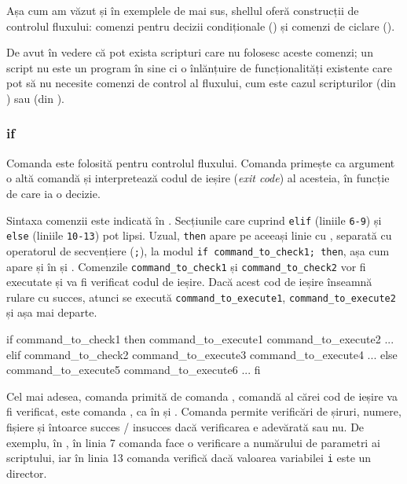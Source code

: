 Așa cum am văzut și în exemplele de mai sus, shellul oferă construcții de
controlul fluxului: comenzi pentru decizii condiționale () și comenzi de
ciclare ().

De avut în vedere că pot exista scripturi care nu folosesc
aceste comenzi; un script nu este un program în sine ci o înlănțuire de
funcționalități existente care pot să nu necesite comenzi de control al
fluxului, cum este cazul scripturilor  (din ) sau  (din ).

\subsubsection{if}
\label{sec:auto:script-func:flow-control:if}

Comanda  este folosită pentru controlul fluxului.
Comanda primește ca argument o altă comandă și interpretează codul de ieșire (\textit{exit code}) al acesteia, în funcție de care ia o decizie.

Sintaxa comenzii  este indicată în .
Secțiunile care cuprind \texttt{elif} (liniile \texttt{6-9}) și \texttt{else} (liniile \texttt{10-13}) pot lipsi.
Uzual, \texttt{then} apare pe aceeași linie cu , separată cu operatorul de secvențiere (\texttt{;}), la modul \texttt{if command\_to\_check1; then}, așa cum apare și în  și .
Comenzile \texttt{command\_to\_check1} și \texttt{command\_to\_check2} vor fi executate și va fi verificat codul de ieșire.
Dacă acest cod de ieșire înseamnă rulare cu succes, atunci se execută \texttt{command\_to\_execute1}, \texttt{command\_to\_execute2} și așa mai departe.

\begin{screen}[caption={Sintaxa comenzii if},label={lst:auto:if-syntax}]
if command_to_check1
then
    command_to_execute1
    command_to_execute2
    ...
elif command_to_check2
    command_to_execute3
    command_to_execute4
    ...
else
    command_to_execute5
    command_to_execute6
    ...
fi
\end{screen}

Cel mai adesea, comanda primită de comanda , comandă al cărei cod de ieșire va fi verificat, este comanda , ca în  și .
Comanda  permite verificări de șiruri, numere, fișiere și întoarce succes / insucces dacă verificarea e adevărată sau nu.
De exemplu, în , în linia 7 comanda  face o verificare a numărului de parametri ai scriptului, iar în linia 13 comanda  verifică dacă valoarea variabilei \texttt{i} este un director.

